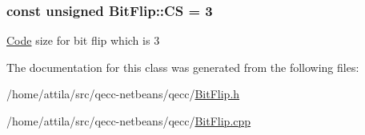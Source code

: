 \subsubsection[{\texorpdfstring{CS}{CS}}]{\setlength{\rightskip}{0pt plus 5cm}const unsigned Bit\+Flip\+::\+CS = 3\hspace{0.3cm}{\ttfamily [static]}}\hypertarget{class_bit_flip_a8f5442dd93f87ea35fcb0b0bb423bbf0}{}\label{class_bit_flip_a8f5442dd93f87ea35fcb0b0bb423bbf0}
\hyperlink{class_code}{Code} size for bit flip which is 3 

The documentation for this class was generated from the following files\+:\begin{DoxyCompactItemize}
\item 
/home/attila/src/qecc-\/netbeans/qecc/\hyperlink{_bit_flip_8h}{Bit\+Flip.\+h}\item 
/home/attila/src/qecc-\/netbeans/qecc/\hyperlink{_bit_flip_8cpp}{Bit\+Flip.\+cpp}\end{DoxyCompactItemize}
